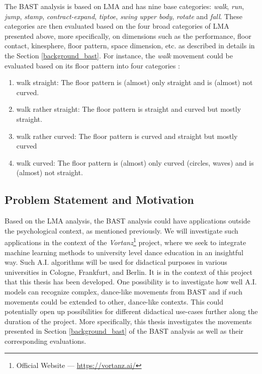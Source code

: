 \documentclass[extern,palatino]{cgMA}
\begin{document}
\noindent The BAST analysis is based on LMA and has nine base categories: \textit{walk}, \textit{run}, \textit{jump}, \textit{stamp}, \textit{contract-expand}, \textit{tiptoe}, \textit{swing upper body}, \textit{rotate} and \textit{fall}. These categories are then evaluated based on the four broad categories of LMA presented above, more specifically, on dimensions such as the performance, floor contact, kinesphere, floor pattern, space dimension, etc. as described in details in the Section \ref{background_bast}. For instance, the \textit{walk} movement could be evaluated based on its floor pattern into four categories \cite{lausberg1994vergleichende}:

\begin{enumerate}
\item walk straight: The floor pattern is (almost) only straight and is (almost) not curved.
\item walk rather straight: The floor pattern is straight and curved but mostly straight.
\item walk rather curved: The floor pattern is curved and straight but mostly curved
\item walk curved: The floor pattern is (almost) only curved (circles, waves) and is (almost) not straight.
\end{enumerate}

\subsection{Problem Statement and Motivation}  
\label{problem_statement_and_motivation}

Based on the LMA analysis, the BAST analysis could have applications outside the psychological context, as mentioned previously. We will investigate such applications in the context of the \textit{Vortanz}\footnote{Official Website --- \url{https://vortanz.ai/}} project, where we seek to integrate machine learning methods to university level dance education in an insightful way. Such A.I. algorithms will be used for didactical purposes in various universities in Cologne, Frankfurt, and Berlin. It is in the context of this project that this thesis has been developed. One possibility is to investigate how well A.I. models can recognize complex, dance-like movements from BAST and if such movements could be extended to other, dance-like contexts. This could potentially open up possibilities for different didactical use-cases further along the duration of the project. More specifically, this thesis investigates the movements presented in Section \ref{background_bast} of the BAST analysis as well as their corresponding evaluations.
\end{document}
